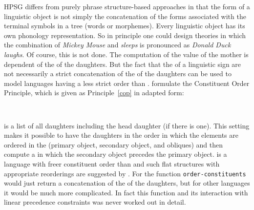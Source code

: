 \documentclass[output=paper
	        ,collection
	        ,collectionchapter
 	        ,biblatex
                ,babelshorthands
                ,newtxmath
                ,draftmode
                ,colorlinks, citecolor=brown
]{langscibook}
\begin{document}
HPSG differs from purely phrase structure-based approaches in that the form of a linguistic object
is not simply the concatenation of the forms associated with the terminal symbols in a tree (words or
morphemes). Every linguistic object has its own phonology representation. So in principle one could
design theories in which the combination of \emph{Mickey Mouse} and \emph{sleeps} is pronounced as
\emph{Donald Duck laughs}. Of course, this is not done. The computation of the \phon value of the
mother is dependent of the \phonvs of the daughters. But the fact that the \phonvs of a linguistic
sign are not necessarily a strict concatenation of the \phonvs of the daughters can be used to model
languages having a less strict order than . \citet[]{ps} formulate the Constituent
Order Principle, which is given as Principle~\ref{cop} in adapted form:
\begin{principle-break}
\label{cop}
~\\[-3mm]
 \impl 
{}
\end{principle-break}
\dtrs is a list of all daughters including the head daughter (if there is one). This setting makes
it possible to have the daughters in the order in which the elements are ordered in the \compsl
(primary object, secondary object, and obliques) and then compute a \phonv in which the secondary
object precedes the primary object.  is a language with freer constituent order than
 and such flat structures with appropriate reorderings are suggested by \citet{AG2000a}. For
 the function \texttt{order-constituents} would just return a concatenation of the \phonvs of the
daughters, but for other languages it would be much more complicated. In fact this function and its
interaction with linear precedence constraints was never worked out in detail.
\end{document}

